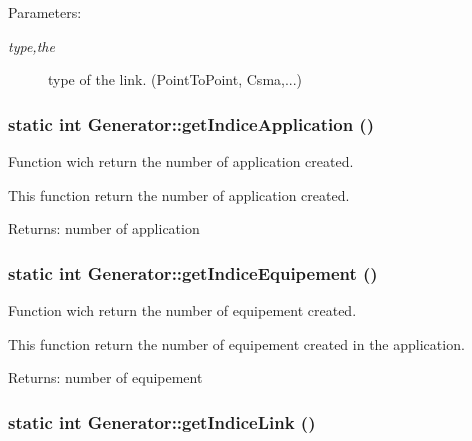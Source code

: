 \begin{Desc}
\item[Parameters:]
\begin{description}
\item[{\em type,the}]type of the link. (PointToPoint, Csma,...) \end{description}
\end{Desc}
\hypertarget{class_generator_c60abf6cfe238b3df6acd838b08ab1b4}{
\subsubsection[{getIndiceApplication}]{\setlength{\rightskip}{0pt plus 5cm}static int Generator::getIndiceApplication ()}}
\label{class_generator_c60abf6cfe238b3df6acd838b08ab1b4}


Function wich return the number of application created. 

This function return the number of application created.

\begin{Desc}
\item[Returns:]number of application \end{Desc}
\hypertarget{class_generator_2f74110fbe7f71d94a42414b1b937304}{
\subsubsection[{getIndiceEquipement}]{\setlength{\rightskip}{0pt plus 5cm}static int Generator::getIndiceEquipement ()}}
\label{class_generator_2f74110fbe7f71d94a42414b1b937304}


Function wich return the number of equipement created. 

This function return the number of equipement created in the application.

\begin{Desc}
\item[Returns:]number of equipement \end{Desc}
\hypertarget{class_generator_91fabfa6a2d67ec6c502b2c1780dc23b}{
\subsubsection[{getIndiceLink}]{\setlength{\rightskip}{0pt plus 5cm}static int Generator::getIndiceLink ()}}
\label{class_generator_91fabfa6a2d67ec6c502b2c1780dc23b}


